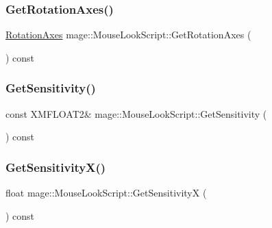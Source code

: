 \subsubsection{\texorpdfstring{Get\+Rotation\+Axes()}{GetRotationAxes()}}
{\footnotesize\ttfamily \hyperlink{classmage_1_1_mouse_look_script_af63fd955f796c11e0378813e5d1ab5f8}{Rotation\+Axes} mage\+::\+Mouse\+Look\+Script\+::\+Get\+Rotation\+Axes (\begin{DoxyParamCaption}{ }\end{DoxyParamCaption}) const\hspace{0.3cm}{\ttfamily [noexcept]}}

\hypertarget{classmage_1_1_mouse_look_script_ac4834dacc6d80a83faaa4e3c3c236ae8}{}\label{classmage_1_1_mouse_look_script_ac4834dacc6d80a83faaa4e3c3c236ae8} 
\subsubsection{\texorpdfstring{Get\+Sensitivity()}{GetSensitivity()}}
{\footnotesize\ttfamily const X\+M\+F\+L\+O\+A\+T2\& mage\+::\+Mouse\+Look\+Script\+::\+Get\+Sensitivity (\begin{DoxyParamCaption}{ }\end{DoxyParamCaption}) const\hspace{0.3cm}{\ttfamily [noexcept]}}

\hypertarget{classmage_1_1_mouse_look_script_a3aec50fa8f0a38878a1977797db3015f}{}\label{classmage_1_1_mouse_look_script_a3aec50fa8f0a38878a1977797db3015f} 
\subsubsection{\texorpdfstring{Get\+Sensitivity\+X()}{GetSensitivityX()}}
{\footnotesize\ttfamily float mage\+::\+Mouse\+Look\+Script\+::\+Get\+SensitivityX (\begin{DoxyParamCaption}{ }\end{DoxyParamCaption}) const\hspace{0.3cm}{\ttfamily [noexcept]}}

\hypertarget{classmage_1_1_mouse_look_script_a4dd528a4a0631acf1f8b64b6039f72b0}{}\label{classmage_1_1_mouse_look_script_a4dd528a4a0631acf1f8b64b6039f72b0} 
